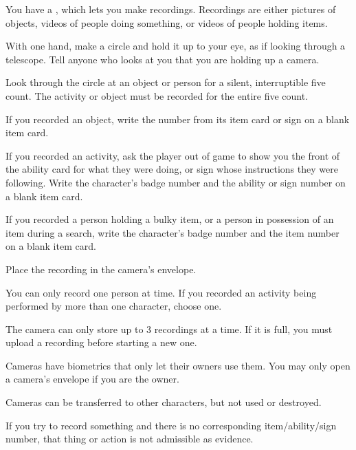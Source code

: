 \documentclass[green]{guildcamp4}
\begin{document}
\name{\gEvidence{}}

You have a \iVideoCamera{\MYname}, which lets you make recordings. Recordings are either pictures of objects, videos of people doing something, or videos of people holding items.
	
\begin{enum}
    \item With one hand, make a circle and hold it up to your eye, as if looking through a telescope. Tell anyone who looks at you that you are holding up a camera.
    \item Look through the circle at an object or person for a silent, interruptible five count. The activity or object must be recorded for the entire five count.
    \item If you recorded an object, write the number from its item card or sign on a blank item card.
    \item If you recorded an activity, ask the player out of game to show you the front of the ability card for what they were doing, or sign whose instructions they were following. Write the character's badge number and the ability or sign number on a blank item card.
    \item If you recorded a person holding a bulky item, or a person in possession of an item during a search, write the character's badge number and the item number on a blank item card.
    \item Place the recording in the camera's envelope.
\end{enum}

\begin{itemz}[Notes]
	\item You can only record one person at time. If you recorded an activity being performed by more than one character, choose one.
	\item The camera can only store up to 3 recordings at a time. If it is full, you must upload a recording before starting a new one. 
	\item Cameras have biometrics that only let their owners use them. You may only open a camera's envelope if you are the owner.
	\item Cameras can be transferred to other characters, but not used or destroyed. 
	\item If you try to record something and there is no corresponding item/ability/sign number, that thing or action is not admissible as evidence.
\end{itemz}
    
\end{document}
